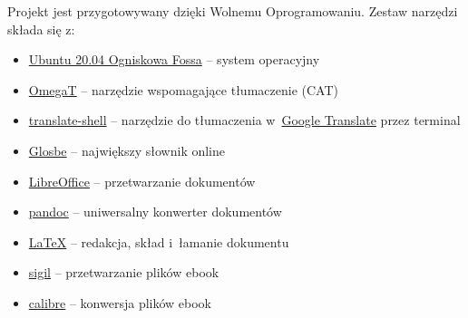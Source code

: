 \documentclass[oneside,polish,11pt,sfheadings]{mwbk}
\begin{document}
Projekt jest przygotowywany dzięki Wolnemu Oprogramowaniu. Zestaw narzędzi składa się z:
\begin{itemize}
\item \href{https://ubuntu.com/}{Ubuntu 20.04 Ogniskowa Fossa} -- system operacyjny
\item \href{https://omegat.org/}{OmegaT} -- narzędzie wspomagające tłumaczenie (CAT)
\item \href{https://github.com/soimort/translate-shell}{translate-shell} -- narzędzie do tłumaczenia w~\href{https://translate.google.pl}{Google Translate} przez terminal 
\item \href{https://glosbe.com/en/pl}{Glosbe} -- największy słownik online
\item \href{https://www.libreoffice.org/}{LibreOffice} -- przetwarzanie dokumentów 
\item \href{http://pandoc.org}{pandoc} -- uniwersalny konwerter dokumentów 
\item \href{https://www.latex-project.org/}{LaTeX} -- redakcja, skład i~łamanie dokumentu
\item \href{https://sigil-ebook.com/}{sigil} -- przetwarzanie plików ebook
\item \href{https://calibre-ebook.com/}{calibre} -- konwersja plików ebook
\end{itemize}



\newpage
\printendnotes

\tableofcontents{}
\end{document}
